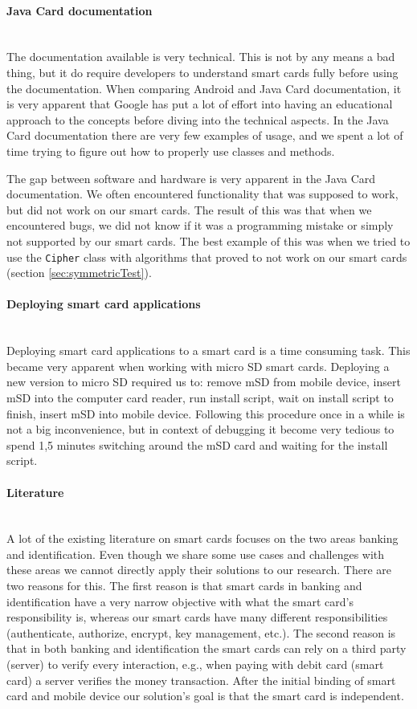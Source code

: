 \paragraph{Java Card documentation}\mbox{}\\
The documentation available is very technical. This is not by any means a bad thing, but it do require developers to understand smart cards fully before using the documentation. When comparing Android and Java Card documentation, it is very apparent that Google has put a lot of effort into having an educational approach to the concepts before diving into the technical aspects. In the Java Card documentation there are very few examples of usage, and we spent a lot of time trying to figure out how to properly use classes and methods.

The gap between software and hardware is very apparent in the Java Card documentation. We often encountered functionality that was supposed to work, but did not work on our smart cards. The result of this was that when we encountered bugs, we did not know if it was a programming mistake or simply not supported by our smart cards. The best example of this was when we tried to use the \texttt{Cipher} class with algorithms that proved to not work on our smart cards (section \ref{sec:symmetricTest}).

\paragraph{Deploying smart card applications}\mbox{}\\
Deploying smart card applications to a smart card is a time consuming task. This became very apparent when working with micro SD smart cards. Deploying a new version to micro SD required us to: remove mSD from mobile device, insert mSD into the computer card reader, run install script, wait on install script to finish, insert mSD into mobile device. Following this procedure once in a while is not a big inconvenience, but in context of debugging it become very tedious to spend 1,5 minutes switching around the mSD card and waiting for the install script.

\paragraph{Literature}\mbox{}\\
A lot of the existing literature on smart cards focuses on the two areas banking and identification. Even though we share some use cases and challenges with these areas we cannot directly apply their solutions to our research. There are two reasons for this. The first reason is that smart cards in banking and identification have a very narrow objective with what the smart card's responsibility is, whereas our smart cards have many different responsibilities (authenticate, authorize, encrypt, key management, etc.). The second reason is that in both banking and identification the smart cards can rely on a third party (server) to verify every interaction, e.g., when paying with debit card (smart card) a server verifies the money transaction. After the initial binding of smart card and mobile device our solution's goal is that the smart card is independent.

